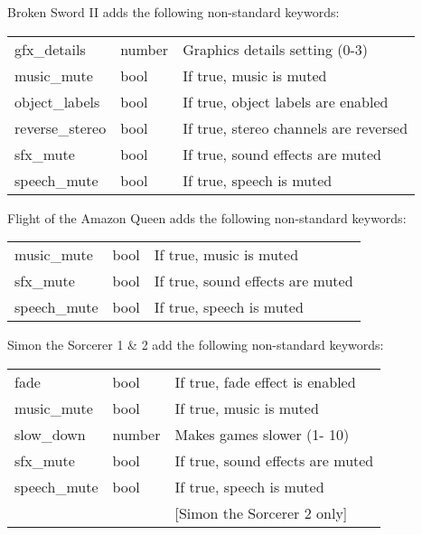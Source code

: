 Broken Sword II adds the following non-standard keywords:\\
\begin{tabular}[h]{lll}
        gfx\_details    &number  &Graphics details setting (0-3)\\
        music\_mute     &bool    &If true, music is muted\\
        object\_labels  &bool    &If true, object labels are enabled\\
        reverse\_stereo &bool    &If true, stereo channels are reversed\\
        sfx\_mute       &bool    &If true, sound effects are muted\\
        speech\_mute    &bool    &If true, speech is muted\\
\end{tabular}

Flight of the Amazon Queen adds the following non-standard keywords:\\
\begin{tabular}[h]{lll}
        music\_mute     &bool    &If true, music is muted\\
        sfx\_mute       &bool    &If true, sound effects are muted\\
        speech\_mute    &bool    &If true, speech is muted\\
\end{tabular}

Simon the Sorcerer 1 \& 2 add the following non-standard keywords:\\
\begin{tabular}[h]{lll}
        fade            &bool    &If true, fade effect is enabled\\
        music\_mute     &bool    &If true, music is muted\\
        slow\_down      &number  &Makes games slower (1- 10)\\
        sfx\_mute       &bool    &If true, sound effects are muted\\
        speech\_mute    &bool    &If true, speech is muted\\
                        &        &[Simon the Sorcerer 2 only]\\
\end{tabular}
